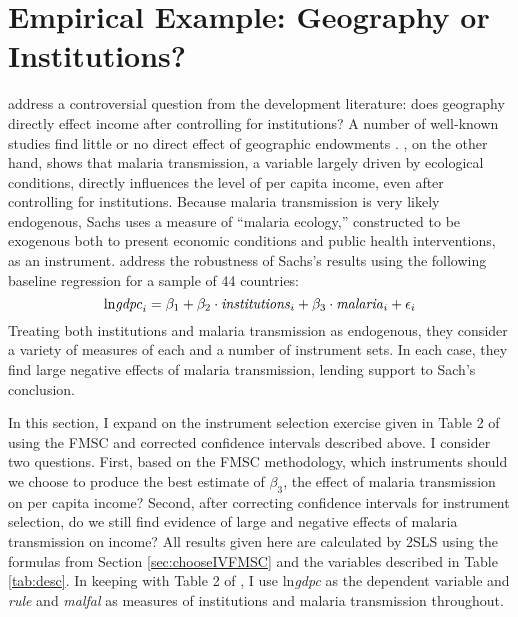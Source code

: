 \section{Empirical Example: Geography or Institutions?}
\label{sec:application}
\cite{Carstensen2006} address a controversial question from the development literature: does geography directly effect income after controlling for institutions? 
A number of well-known studies find little or no direct effect of geographic endowments \citep{Acemoglu,Rodrik,Easterly}. \cite{Sachs}, on the other hand, shows that malaria transmission, a variable largely driven by ecological conditions, directly influences the level of per capita income, even after controlling for institutions. Because malaria transmission is very likely endogenous, Sachs uses a measure of ``malaria ecology,'' constructed to be exogenous both to present economic conditions and public health interventions, as an instrument. 
\cite{Carstensen2006} address the robustness of Sachs's results using the following baseline regression for a sample of 44 countries:
\begin{equation}
	\mbox{ln\emph{gdpc}}_i = \beta_1 + \beta_2 \cdot \mbox{\emph{institutions}}_i + \beta_3 \cdot \mbox{\emph{malaria}}_i + \epsilon_i
\end{equation}
Treating both institutions and malaria transmission as endogenous, they consider a variety of measures of each and a number of instrument sets. 
In each case, they find large negative effects of malaria transmission, lending support to Sach's conclusion.

In this section, I expand on the instrument selection exercise given in Table 2 of \cite{Carstensen2006} using the FMSC and corrected confidence intervals described above. I consider two questions. 
First, based on the FMSC methodology, which instruments should we choose to produce the best estimate of $\beta_3$, the effect of malaria transmission on per capita income? 
Second, after correcting confidence intervals for instrument selection, do we still find evidence of large and negative effects of malaria transmission on income? 
All results given here are calculated by 2SLS using the formulas from Section \ref{sec:chooseIVFMSC} and the variables described in Table \ref{tab:desc}. 
In keeping with Table 2 of \cite{Carstensen2006}, I use ln\emph{gdpc} as the dependent variable and \emph{rule} and \emph{malfal} as measures of institutions and malaria transmission throughout.


